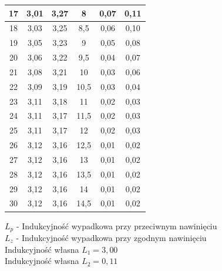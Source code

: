 \documentclass[a4paper,10pt,twoside]{article}
\begin{document}
\begin{table}[htb]
\begin{tabular}{|c|c|c|c|c|c|}
		17     & 3,01       & 3,27 & 8       & 0,07                          & 0,11                      \\ \hline
		18     & 3,03       & 3,25 & 8,5     & 0,06                          & 0,10                      \\ \hline
		19     & 3,05       & 3,23 & 9       & 0,05                          & 0,08                      \\ \hline
		20     & 3,06       & 3,22 & 9,5     & 0,04                          & 0,07                      \\ \hline
		21     & 3,08       & 3,21 & 10      & 0,03                          & 0,06                      \\ \hline
		22     & 3,09       & 3,19 & 10,5    & 0,03                          & 0,04                      \\ \hline
		23     & 3,11       & 3,18 & 11      & 0,02                          & 0,03                      \\ \hline
		24     & 3,11       & 3,17 & 11,5    & 0,02                          & 0,03                      \\ \hline
		25     & 3,11       & 3,17 & 12      & 0,02                          & 0,03                      \\ \hline
		26     & 3,12       & 3,16 & 12,5    & 0,01                          & 0,02                      \\ \hline
		27     & 3,12       & 3,16 & 13      & 0,01                          & 0,02                      \\ \hline
		28     & 3,12       & 3,16 & 13,5    & 0,01                          & 0,02                      \\ \hline
		29     & 3,12       & 3,16 & 14      & 0,01                          & 0,02                      \\ \hline
		30     & 3,12       & 3,16 & 14,5    & 0,01                          & 0,02                      \\ \hline
	\end{tabular}
\end{table}
\noindent
$L_p$ - Indukcyjność wypadkowa przy przeciwnym nawinięciu \\
$L_z$ - Indukcyjność wypadkowa przy zgodnym nawinięciu \\
Indukcyjność własna $L_1 = 3,00$\\
Indukcyjność własna $L_2 = 0,11$

 \newpage
	
\end{document}
